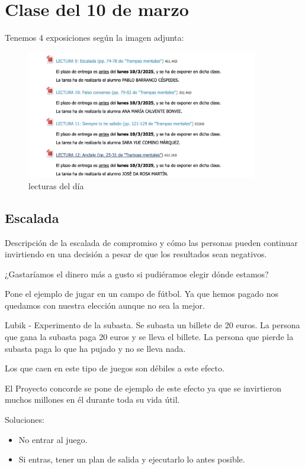 \documentclass[12pt, a4paper, twoside]{article}
\begin{document}
\section{Clase del 10 de marzo}

Tenemos 4 exposiciones según la imagen adjunta:

\begin{figure}[h]
    \centering
    \includegraphics[width=0.9\textwidth]{./Images/0310.jpg}
    \caption{lecturas del día}
\end{figure}

\subsection{Escalada}

Descripción de la escalada de compromiso y cómo las personas pueden continuar invirtiendo en una decisión a pesar de que los resultados sean negativos.

¿Gastaríamos el dinero más a gusto si pudiéramos elegir dónde estamos?

Pone el ejemplo de jugar en un campo de fútbol. Ya que hemos pagado nos quedamos con nuestra elección
aunque no sea la mejor.

Lubik - Experimento de la subasta. Se subasta un billete de 20 euros. La persona que gana la subasta
paga 20 euros y se lleva el billete. La persona que pierde la subasta paga lo que ha pujado y no se lleva nada.

Los que caen en este tipo de juegos son débiles a este efecto.

El Proyecto concorde se pone de ejemplo de este efecto ya que se invirtieron muchos millones en él durante
toda su vida útil.  


Soluciones:

\begin{itemize}
    \item No entrar al juego.
    \item Si entras, tener un plan de salida y ejecutarlo lo antes posible.

\end{itemize}
\end{document}
